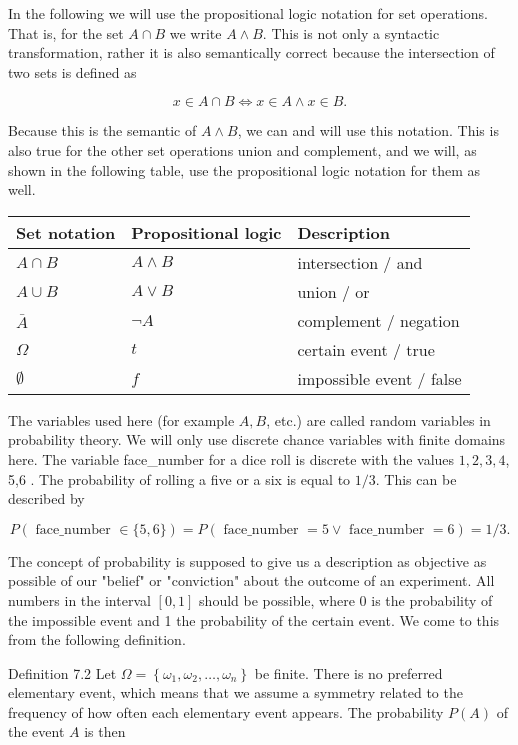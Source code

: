 \documentclass[10pt]{article}
\begin{document}
In the following we will use the propositional logic notation for set operations. That is, for the set $A \cap B$ we write $A \wedge B$. This is not only a syntactic transformation, rather it is also semantically correct because the intersection of two sets is defined as

$$
x \in A \cap B \Leftrightarrow x \in A \wedge x \in B .
$$

Because this is the semantic of $A \wedge B$, we can and will use this notation. This is also true for the other set operations union and complement, and we will, as shown in the following table, use the propositional logic notation for them as well.

\begin{center}
\begin{tabular}{|l|l|l|}
\hline
Set notation & Propositional logic & Description \\
\hline
$A \cap B$ & $A \wedge B$ & intersection / and \\
\hline
$A \cup B$ & $A \vee B$ & union / or \\
\hline
$\bar{A}$ & $\neg A$ & complement / negation \\
\hline
$\Omega$ & $t$ & certain event / true \\
\hline
$\emptyset$ & $f$ & impossible event / false \\
\hline
\end{tabular}
\end{center}

The variables used here (for example $A, B$, etc.) are called random variables in probability theory. We will only use discrete chance variables with finite domains here. The variable face\_number for a dice roll is discrete with the values $1,2,3,4$, 5,6 . The probability of rolling a five or a six is equal to $1 / 3$. This can be described by

$$
P(\text { face_number } \in\{5,6\})=P(\text { face_number }=5 \vee \text { face_number }=6)=1 / 3 .
$$

The concept of probability is supposed to give us a description as objective as possible of our "belief" or "conviction" about the outcome of an experiment. All numbers in the interval $[0,1]$ should be possible, where 0 is the probability of the impossible event and 1 the probability of the certain event. We come to this from the following definition.

Definition 7.2 Let $\Omega=\left\{\omega_{1}, \omega_{2}, \ldots, \omega_{n}\right\}$ be finite. There is no preferred elementary event, which means that we assume a symmetry related to the frequency of how often each elementary event appears. The probability $P(A)$ of the event $A$ is then
\end{document}
